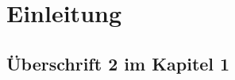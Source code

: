 \chapter{Einleitung}
\label{cha:einleitung}
\lipsum[1-1]




\section{Überschrift 2 im Kapitel 1}
\label{sec:Ziel}

\lipsum[1-3]